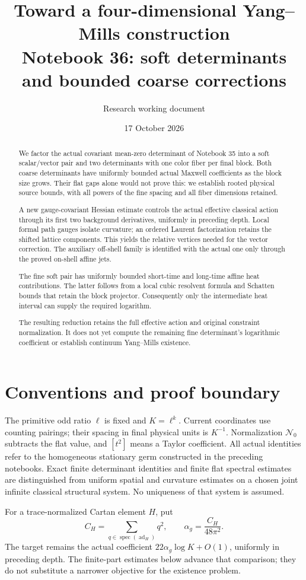 \documentclass[11pt]{article}
\title{Toward a four-dimensional Yang--Mills construction\\
\large Notebook 36: soft determinants and bounded coarse corrections}
\author{Research working document}
\date{17 October 2026}
\theoremstyle{remark}
\begin{document}
\maketitle
\begin{abstract}
We factor the actual covariant mean-zero determinant of Notebook 35
into a soft scalar/vector pair and two determinants with one color
fiber per final block. Both coarse determinants have uniformly bounded
actual Maxwell coefficients as the block size grows. Their flat gaps
alone would not prove this: we establish rooted physical source bounds,
with all powers of the fine spacing and all fiber dimensions retained.

A new gauge-covariant Hessian estimate controls the actual effective
classical action through its first two background derivatives, uniformly
in preceding depth. Local formal path gauges isolate curvature; an
ordered Laurent factorization retains the shifted lattice components.
This yields the relative vertices needed for the vector correction.
The auxiliary off-shell family is identified with the actual one only
through the proved on-shell affine jets.

The fine soft pair has uniformly bounded short-time and long-time
affine heat contributions. The latter follows from a local cubic
resolvent formula and Schatten bounds that retain the block projector.
Consequently only the intermediate heat interval can supply the
required logarithm.

The resulting reduction retains the full effective action and original
constraint normalization. It does not yet compute the remaining fine
determinant's logarithmic coefficient or establish continuum
Yang--Mills existence.
\end{abstract}

\section*{Conventions and proof boundary}

The primitive odd ratio \(\ell\) is fixed and \(K=\ell^k\).
Current coordinates use counting pairings; their spacing in final
physical units is \(K^{-1}\). Normalization \(\mathcal N_0\) subtracts
the flat value, and \([t^2]\) means a Taylor coefficient.
All actual identities refer to the homogeneous stationary germ
constructed in the preceding notebooks. Exact finite determinant
identities and finite flat spectral estimates are distinguished from
uniform spatial and curvature estimates on a chosen joint infinite
classical structural system. No uniqueness of that system is assumed.

For a trace-normalized Cartan element \(H\), put
\[
 C_H=\sum_{q\in\operatorname{spec}(\operatorname{ad}_H)}q^2,
 \qquad \alpha_g=\frac{C_H}{48\pi^2}.
\]
The target remains the actual coefficient
\(22\alpha_g\log K+O(1)\), uniformly in preceding depth.
The finite-part estimates below advance that comparison; they do not
substitute a narrower objective for the existence problem.
\end{document}
